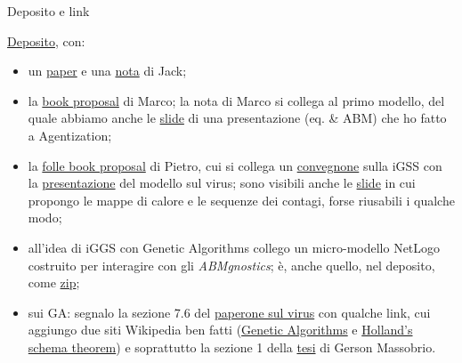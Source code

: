 \documentclass[9pt]{beamer}
\begin{document}
\begin{frame}{Deposito e link}

\href{https://terna.to.it/ejmmp/deposito/}{Deposito}, con:

\begin{itemize}

\item
un \href{https://terna.to.it/ejmmp/deposito/JackIonHayek'sEconomics.pdf}{paper} e una \href{https://terna.to.it/ejmmp/deposito/JackIIonHayek-NoteOnAtomicInvestmentProcesses.pdf}{nota} di Jack;

\item
la \href{https://terna.to.it/ejmmp/deposito/MarcoBookProposalTheoreticalModelBookProposal.pdf}{book proposal} di Marco; la nota di Marco si collega al primo modello, del quale abbiamo anche le \href{https://terna.to.it/oligopolyAgentization.pdf}{slide} di una presentazione (eq. \& ABM) che ho fatto a Agentization;

\item
la \href{https://terna.to.it/ejmmp/deposito/PietroBookProposal.pdf}{folle book proposal} di Pietro, cui si collega un \href{https://www.igss-workshop.org}{convegnone} sulla iGSS con la \href{https://www.youtube.com/watch?v=X7DLFvOhqVo}{presentazione} del modello sul virus; sono visibili anche le \href{https://static1.squarespace.com/static/5e0a8466674f5b6963a2e949/t/60bff462ace45c3d0b9f04cf/1623192677563/terna-slides.pdf}{slide} in cui propongo le mappe di calore e le sequenze dei contagi, forse riusabili i qualche modo;

\item
all'idea di iGGS con Genetic Algorithms collego un micro-modello NetLogo costruito per interagire con gli \emph{ABMgnostics}; \`{e}, anche quello, nel deposito, come \href{https://terna.to.it/ejmmp/deposito/theRace.zip}{zip};

\item
sui GA: segnalo la sezione 7.6 del \href{https://arxiv.org/pdf/2108.08885.pdf}{paperone sul virus} con qualche link, cui aggiungo due siti Wikipedia ben fatti (\href{https://en.wikipedia.org/wiki/Genetic_algorithm}{Genetic Algorithms} e \href{https://en.wikipedia.org/wiki/Holland\%27s\_schema\_theorem}{Holland's schema theorem}) e soprattutto la sezione 1 della \href{https://terna.to.it/tesi/massobrio.pdf}{tesi} di Gerson Massobrio.

\end{itemize}

\end{frame}
\end{document}
